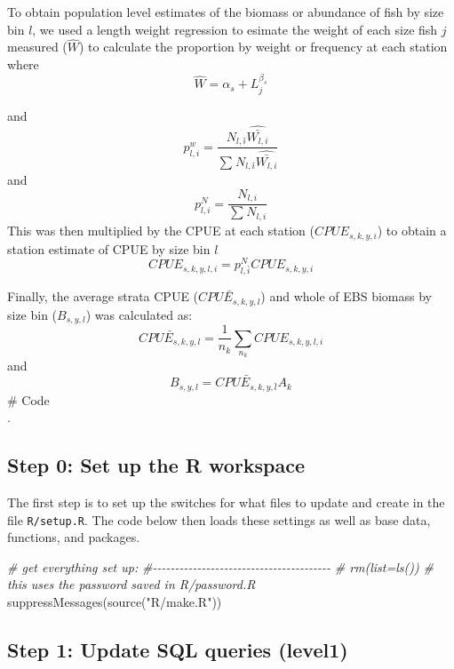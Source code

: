 \documentclass[
]{article}
\newenvironment{Shaded}{\begin{snugshade}}{\end{snugshade}}
\newcommand{\CommentTok}[1]{\textcolor[rgb]{0.56,0.35,0.01}{\textit{#1}}}
\newcommand{\FunctionTok}[1]{\textcolor[rgb]{0.00,0.00,0.00}{#1}}
\newcommand{\NormalTok}[1]{#1}
\newcommand{\StringTok}[1]{\textcolor[rgb]{0.31,0.60,0.02}{#1}}
\begin{document}
To obtain population level estimates of the biomass or abundance of fish
by size bin \(l\), we used a length weight regression to esimate the
weight of each size fish \(j\) measured (\(\hat{W}\)) to calculate the
proportion by weight or frequency at each station where
\[\hat{W} = \alpha_s+L_j^{\beta_s} \]

and
\[p^w_{l,i} = \frac{N_{l,i}\dot{}\hat{\bar{W_{l,i}}}}{\sum_{}{N_{l,i}\dot{}\hat{\bar{W_{l,i}}}}}\]
and \[p^N_{l,i} = \frac{N_{l,i}}{\sum_{}{N_{l,i}}}\] This was then
multiplied by the CPUE at each station (\(CPUE_{s,k,y,i}\)) to obtain a
station estimate of CPUE by size bin \(l\)
\[CPUE_{s,k,y,l,i} = p^N_{l,i}\dot{}CPUE_{s,k,y,i}\]

Finally, the average strata CPUE (\(\bar{CPUE_{s,k,y,l}}\)) and whole of
EBS biomass by size bin (\(B_{s,y,l}\)) was calculated as:
\[\bar{CPUE_{s,k,y,l}} = \frac{1}{n_k}\dot{}\sum_{n_k}{CPUE_{s,k,y,l,i}}\]
and \[B_{s,y,l}= \bar{CPUE_{s,k,y,l}}\dot{}A_{k}\] \# Code\\
.

\hypertarget{step-0-set-up-the-r-workspace}{%
\subsection{Step 0: Set up the R
workspace}\label{step-0-set-up-the-r-workspace}}

The first step is to set up the switches for what files to update and
create in the file \texttt{R/setup.R}. The code below then loads these
settings as well as base data, functions, and packages.

\begin{Shaded}
\begin{Highlighting}[]
  \CommentTok{\# get everything set up:}
  \CommentTok{\#{-}{-}{-}{-}{-}{-}{-}{-}{-}{-}{-}{-}{-}{-}{-}{-}{-}{-}{-}{-}{-}{-}{-}{-}{-}{-}{-}{-}{-}{-}{-}{-}{-}{-}{-}{-}{-}{-}{-}{-}}
    \CommentTok{\# rm(list=ls())}
\CommentTok{\# this uses the password saved in R/password.R}
    \FunctionTok{suppressMessages}\NormalTok{(}\FunctionTok{source}\NormalTok{(}\StringTok{"R/make.R"}\NormalTok{))}
\end{Highlighting}
\end{Shaded}

\hypertarget{step-1-update-sql-queries-level1}{%
\subsection{Step 1: Update SQL queries
(level1)}\label{step-1-update-sql-queries-level1}}
\end{document}
